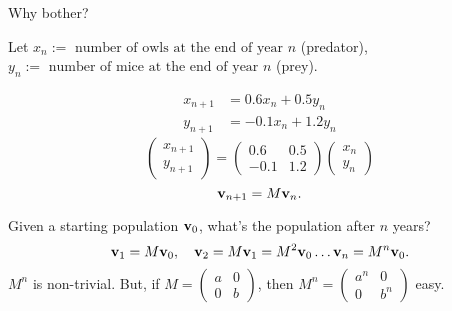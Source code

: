 \documentclass[10pt, a4paper]{article}
\begin{document}
Why bother?
\begin{example}\phantom{}

    Let $x_n := \text{ number of owls at the end of year $n$}$
    (predator),
    $y_n := \text{ number of mice at the end of year $n$}$
    (prey).
    
    \begin{align*}
        x_{n + 1} &= 0.6x_n + 0.5y_n \\
        y_{n + 1} &= -0.1x_n + 1.2y_n
    \end{align*}
    \[
    \begin{pmatrix}
        x_{n + 1} \\ y_{n + 1}
    \end{pmatrix}
    =
    \begin{pmatrix}
        0.6 & 0.5 \\
        -0.1 & 1.2
    \end{pmatrix}
    \begin{pmatrix}
        x_n \\ y_n
    \end{pmatrix}
    \]
    \[
    \mathbf{v}_{n + 1} = M\mathbf{v}_n.
    \]

    Given a starting population $\mathbf{v}_0$,
    what's the population after $n$ years?
    \[
    \mathbf{v}_1 = M\mathbf{v}_0, \quad\mathbf{v}_2 = M\mathbf{v}_1 = M ^ 2\mathbf{v}_0\dotsc \mathbf{v}_n = M ^ n\mathbf{v}_0.
    \]
    $M ^ n$ is non-trivial.
    But,
    if $M = \begin{pmatrix}
        a & 0 \\ 0 & b
    \end{pmatrix}$,
    then $M ^ n = \begin{pmatrix}
        a ^ n & 0 \\ 0 & b ^ n
    \end{pmatrix}$ easy.
\end{example}
\end{document}
